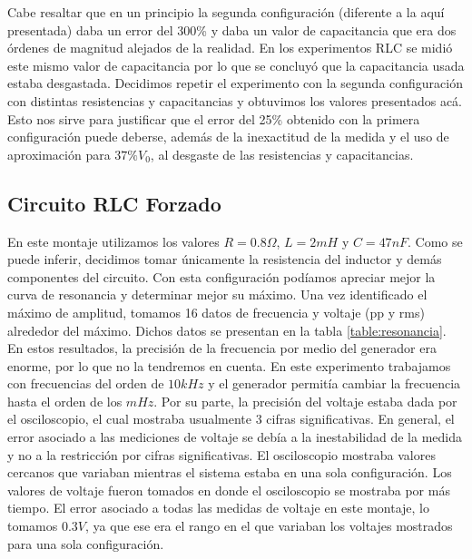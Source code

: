 \documentclass[%
 reprint,
 amsmath,amssymb,
 aps,
]{revtex4-1}
\begin{document}
Cabe resaltar que en un principio la segunda configuración (diferente a la aquí presentada) daba un error del 300\% y daba un valor de capacitancia que era dos órdenes de magnitud alejados de la realidad. En los experimentos RLC se midió este mismo valor de capacitancia por lo que se concluyó que la capacitancia usada estaba desgastada. Decidimos repetir el experimento con la segunda configuración con distintas resistencias y capacitancias y obtuvimos los valores presentados acá. Esto nos sirve para justificar que el error del 25\% obtenido con la primera configuración puede deberse, además de la inexactitud de la medida y el uso de aproximación para $37\% V_0$, al desgaste de las resistencias y capacitancias.\\


\subsection{\label{sec:level2}Circuito RLC Forzado}
En este montaje utilizamos los valores $R = 0.8\Omega$, $L = 2mH$ y $C = 47nF$. Como se puede inferir, decidimos tomar \'unicamente la resistencia del inductor y dem\'as componentes del circuito. Con esta configuraci\'on pod\'iamos apreciar mejor la curva de resonancia y determinar mejor su m\'aximo. Una vez identificado el m\'aximo de amplitud, tomamos 16 datos de frecuencia y voltaje (pp y rms) alrededor del m\'aximo. Dichos datos se presentan en la tabla \ref{table:resonancia}. \\

En estos resultados, la precisi\'on de la frecuencia por medio del generador era enorme, por lo que no la tendremos en cuenta. En este experimento trabajamos con frecuencias del orden de $10kHz$ y el generador permit\'ia cambiar la frecuencia hasta el orden de los $mHz$. Por su parte, la precisi\'on del voltaje estaba dada por el osciloscopio, el cual mostraba usualmente 3 cifras significativas. En general, el error asociado a las mediciones de voltaje se deb\'ia a la inestabilidad de la medida y no a la restricci\'on por cifras significativas. El osciloscopio mostraba valores cercanos que variaban mientras el sistema estaba en una sola configuraci\'on. Los valores de voltaje fueron tomados en donde el osciloscopio se mostraba por m\'as tiempo. El error asociado a todas las medidas de voltaje en este montaje, lo tomamos $0.3V$, ya que ese era el rango en el que variaban los voltajes mostrados para una sola configuraci\'on.\\
\end{document}
